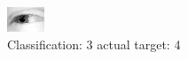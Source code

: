 \begin{figure}[h!]
\begin{center}
\includegraphics[width=0.60\columnwidth]{figures/ID2446_class_3_target_4.png}
\end{center}
\caption{ Classification: 3 actual target: 4}
\label{fig:ID2446_class_3_target_4}
\end{figure}
